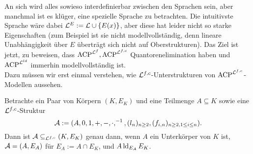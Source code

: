     An sich wird alles sowieso interdefinierbar zwischen den Sprachen sein, aber manchmal ist es klüger, eine spezielle Sprache zu betrachten. Die intuitivste Sprache wäre dabei $\mathcal{L}^E:=\mathcal{L}\cup\{E(x)\}$, aber diese hat leider nicht so starke Eigenschaften (zum Beispiel ist sie nicht modellvollständig, denn lineare Unabhängigkeit über $E$ überträgt sich nicht auf Oberstrukturen). Das Ziel ist jetzt, zu beweisen, dass $\operatorname{ACP}^{\mathcal{L}^f},\operatorname{ACP}^{\mathcal{L}^{f,c}}$ Quantoren\-eli\-mi\-na\-tion haben und $\operatorname{ACP}^{\mathcal{L}^{ld}}$ immerhin modellvollständig ist.\\
    Dazu müssen wir erst einmal verstehen, wie $\mathcal{L}^{f,c}$-Unterstrukturen von $\operatorname{ACP}^{\mathcal{L}^{f,c}}$-Modellen aussehen.
    
    \begin{lemma}
    	Betrachte ein Paar von Körpern $(K,E_K)$ und eine Teilmenge ${A\subseteq K}$ sowie eine $\mathcal{L}^{f,c}$-Struktur $$\mathcal{A}:=(A,0,1,+,-,\cdot,^{-1},(l_n)_{n\geq2},(f_{i,n})_{n\geq2,1\leq i\leq n}).$$ Dann ist $\mathcal{A}\subseteq_{\mathcal{L}^{f,c}}(K,E_K)$ genau dann, wenn $A$ ein Unterkörper von $K$ ist, $\mathcal{A}=(A,E_A)$ für $E_A:=A\cap E_K$, und $A\operatorname{ld}_{E_A}E_K$.
    \end{lemma}
